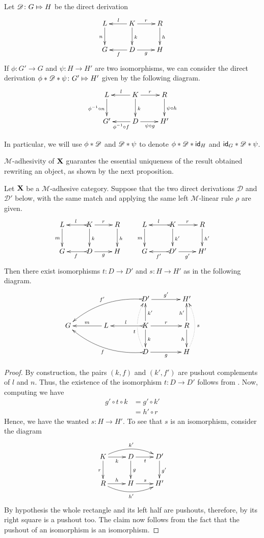 \begin{remark}\label{exa:conc} Let  $\mathscr{D}\colon G\Mapsto H$ be the direct derivation 
		\[\xymatrix{L \ar[d]_{n}& K \ar[d]^{k}\ar[l]_{l} \ar[r]^{r} & R \ar[d]^{h}\\G & \ar[l]^{f} D \ar[r]_{g}& H}\]
	If $\phi\colon G'\to G$ and $\psi\colon H\to H'$ are two isomorphisms, 	we can consider the direct derivation	$\phi * \mathscr{D}*\psi \colon G'\Mapsto H'$ given by the following diagram.
	\[\xymatrix{L \ar[d]_{\phi^{-1} \circ n}& K \ar[d]^{k}\ar[l]_{l} \ar[r]^{r} & R \ar[d]^{\psi \circ h}\\G' & \ar[l]^{\phi^{-1} \circ f} D \ar[r]_{\psi \circ g}& H'}\]
	
	In particular, we will use $\phi*\mathscr{D}$ and $\mathscr{D}*\psi$  to denote $\phi*\mathscr{D}*\mathsf{id}_{H}$ and $\mathsf{id}_{G}*\mathscr{D}*\psi$.
\end{remark}

$\mathcal{M}$-adhesivity of $\textbf {\textup{X}}$ guarantes the essential uniqueness of the result obtained rewriting an object, as shown by the next proposition.

\begin{proposition}\label{prop:unique} Let $\textbf {\textup{X}}$  be a $\mathcal{M}$-adhesive category. Suppose that the two direct derivations $\mathscr{D}$ and $\mathscr{D'}$ below, with the same match and applying the same left $\mathcal{M}$-linear rule $\rho$ are given.
	\[\xymatrix{L \ar[d]_{m}& K \ar[d]^{k}\ar@{>->}[l]_{l} \ar[r]^{r} & R \ar[d]^{h} & L \ar[d]_{m}& K \ar[d]^{k'}\ar@{>->}[l]_{l} \ar[r]^{r} & R \ar[d]^{h'}\\G & \ar@{>->}[l]^{f} D \ar[r]_{g}& H & G & \ar@{>->}[l]^{f'} D' \ar[r]_{g'}& H'}\]
Then there exist isomorphisms $t\colon D\to D'$ and $s\colon H\to H'$ as in the following diagram.
\[\xymatrix@C=40pt{&&D' \ar[r]^{g'} \ar@{>->}@/_.45cm/[dll]_{f'}&H'\\G & L \ar[l]_{m} & K \ar[u]_{k'} \ar[d]^{k}\ar[r]^{r} \ar@{>->}[l]_{l} &R\ar[u]^{h'} \ar[d]_{h}\\&&D\ar@{>->}@/^.45cm/[ull]^{f}\ar@/^.4cm/@{.>}[uu]^(.4){t}|\hole \ar[r]_{g}&H\ar@/_.4cm/@{.>}[uu]_{s}}\]
\end{proposition}
\begin{proof}
	By construction, the pairs $(k, f)$ and $(k', f')$ are pushout complements of $l$ and $n$. Thus, the existence of the isomorphism $t\colon D\to D'$ follows from . Now, computing we have
	\begin{align*}
		g'\circ t \circ k &= g' \circ k'\\&=h'\circ r
	\end{align*}
	Hence, we have the wanted $s\colon H\to H'$. To see that $s$ is an isomorphism, consider the diagram 
	\[\xymatrix{K  \ar@/^.4cm/[rr]^{k'}\ar[d]_{r} \ar[r]_{k}& \ar[r]_{t} D \ar[d]^{g}& D' \ar[d]^{g'}\\ R \ar@/_.4cm/[rr]_{h'} \ar[r]^{h}& H \ar[r]^{s}& H'}\]
	By hypothesis the whole rectangle and its left half are pushouts, therefore, by  its right square is a pushout too. The claim now follows from the fact that the pushout of an isomorphism is an isomorphism.
\end{proof}

